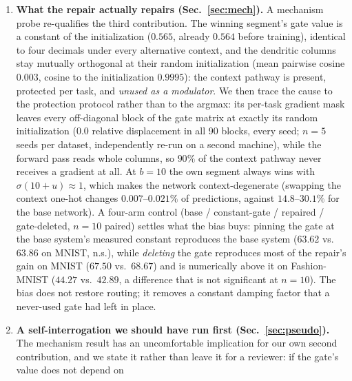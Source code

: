 \documentclass[review,12pt,number]{elsarticle}
\begin{document}
\begin{enumerate}
      smallest gains;
      zero mortality with no gain), so gate death is neither necessary nor
      sufficient. A $2\times 2$ width $\times$ normalization scan
      ($320$ runs) removes the one confound we had to disclose: normalization
      collapses the gain at both widths, while widening the trunk $7.8\times$
      \emph{increases} it.
\item \textbf{What the repair actually repairs (Sec.~\ref{sec:mech}).} A
      mechanism probe re-qualifies the third contribution. The winning
      segment's gate value is a constant of the initialization ($0.565$,
      already $0.564$ before training), identical to four decimals under
      every alternative context, and the dendritic columns stay mutually
      orthogonal at their random initialization (mean pairwise cosine
      $0.003$, cosine to the initialization $0.9995$): the context pathway
      is present, protected per task, and \emph{unused as a modulator}.
      We then trace the cause to the protection protocol rather than to
      the argmax: its per-task gradient mask leaves every off-diagonal
      block of the gate matrix at exactly its random initialization
      ($0.0$ relative displacement in all 90 blocks, every seed; $n=5$
      seeds per dataset, independently re-run on a second machine), while
      the forward pass reads whole columns, so $90\%$ of the context
      pathway never receives a gradient at all. At
      $b{=}10$ the own segment always wins with $\sigma(10+u)\approx 1$,
      which makes the network context-degenerate (swapping the context
      one-hot changes $0.007$--$0.021\%$ of predictions, against
      $14.8$--$30.1\%$ for the base network). A four-arm control (base /
      constant-gate / repaired / gate-deleted, $n{=}10$ paired) settles
      what the bias buys: pinning the gate at the base system's measured
      constant reproduces the base system ($63.62$ vs.\ $63.86$ on MNIST,
      n.s.), while \emph{deleting} the gate reproduces most of the repair's
      gain on MNIST ($67.50$ vs.\ $68.67$) and is numerically above it on
      Fashion-MNIST ($44.27$ vs.\ $42.89$, a difference that is not significant
      at $n{=}10$). The bias does not restore
      routing; it removes a constant damping factor that a never-used gate
      had left in place.
\item \textbf{A self-interrogation we should have run first
      (Sec.~\ref{sec:pseudo}).} The mechanism result has an uncomfortable
      implication for our own second contribution, and we state it rather
      than leave it for a reviewer: if the gate's value does not depend on

\end{enumerate}
\end{document}
